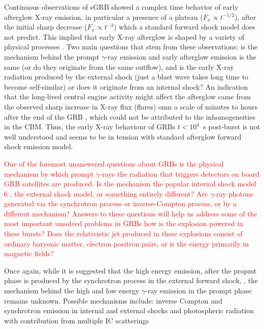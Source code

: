 \documentclass[11pt,a4paper,headinclude=true,DIV=14,BCOR=8mm,chapterprefix,listof=totoc,twoside,openright,abstracton]{scrbook}
\begin{document}
Continuous observations of sGRB showed a complex time behavior of early afterglow X-ray emission, in particular a presence of a plateau ($F_{x}\propto t^{-1/2}$), after the initial sharp decrease ($F_{x}\propto t^{-3}$) which a standard forward shock model does not predict. This implied that early X-ray afterglow is shaped by a variety of physical processes \cite{Zhang et al., 2006}.
Two main questions that stem from these observations: is the mechanism behind the prompt $\gamma$-ray emission and early afterglow emission is the same (or do they originate from the same outflow), and is the early X-ray radiation produced by the external shock (just a blast wave takes long time to become self-similar) or does it originate from an internal shock?
An indication that the long-lived central engine activity might affect the afterglow came from the observed sharp increase in X-ray flux (flares) omn a scale of minutes to hours after the end of the GRB \cite{(Burrows et al., 2005b; Chincarini et al., 2007, 2010; Margutti et al., 2011)}, which could not be attributed to the inhomogeneities in the CBM.
Thus, the early X-ray behaviour of GRBs $t < 10^{4}$~s post-burst is not well understood and seems to be in tension with standard afterglow forward shock emission model.

\textcolor{red}{
    One of the foremost unanswered questions about GRBs is the physical mechanism
    by which prompt $\gamma$-rays the radiation that triggers detectors on board
    GRB satellites are produced. Is the mechanism the popular internal shock
    model 6 \cite{(Rees and Meszaros, 1994)}, the external shock model, or something
    entirely different? Are $\gamma$-ray photons generated via the synchrotron process
    or inverse-Compton process, or by a different mechanism? Answers to these
    questions will help us address some of the most important unsolved problems
    in GRBs  how is the explosion powered in these bursts? Does the relativistic
    jet produced in these explosions consist of ordinary baryonic matter, electron positron
    pairs, or is the energy primarily in magnetic fields?
}

Once again, while it is suggested that the high energy emission, after the propmt phase is produced by the synchrotron process in the external forward shock, \cite{(Kumar and Barniol Duran, 2009; Ghisellini et al., 2010).}, the mechanism behind the high and low energy $\gamma$-ray emission in the prompt phase remains unknown. 
Possible mechanisms include: inverse Compton and synchrotron emission in internal and external shocks \cite{(e.g. Rees and Meszaros, 1992; Dermer and Mitman, 1999; Lyutikov and Blandford, 2003; Zhang and Yan, 2011);} and 
photospheric radiation with contribution from multiple IC scatterings \cite{(e.g. Thompson, 1994; Ghisellini and Celotti, 1999; Meszaros and Rees, 2000b; Pe'er et al., 2006b; Pe'er, 2008; Giannios and Spruit, 2007; Ioka et al., 2007; Asano and Terasawa, 2009; Lazzati and Begelman, 2010; Beloborodov, 2010; Toma et al., 2011b; Mizuta et al., 2011; Nagakura et al., 2011; Bromberg et al., 2011a).}
\end{document}
